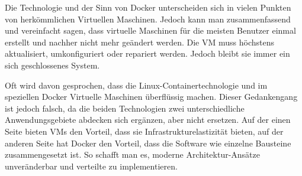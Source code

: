 
Die Technologie und der Sinn von Docker unterscheiden sich in vielen Punkten von herkömmlichen Virtuellen Maschinen. Jedoch kann man zusammenfassend und vereinfacht sagen, dass virtuelle Maschinen für die meisten Benutzer einmal erstellt und nachher nicht mehr geändert werden. Die VM muss höchstens aktualisiert, umkonfiguriert oder repariert werden. Jedoch bleibt sie immer ein sich geschlossenes System.

Oft wird davon gesprochen, dass die Linux-Containertechnologie und im speziellen Docker Virtuelle Maschinen überflüssig machen. Dieser Gedankengang ist jedoch falsch, da die beiden Technologien zwei unterschiedliche Anwendungsgebiete abdecken sich ergänzen, aber nicht ersetzen. Auf der einen Seite bieten VMs den Vorteil, dass sie Infrastrukturelastizität bieten, auf der anderen Seite hat Docker den Vorteil, dass die Software wie einzelne Bausteine zusammengesetzt ist. So schafft man es, moderne Architektur-Ansätze unveränderbar und verteilte zu implementieren. \cite{DockerVsVm}
